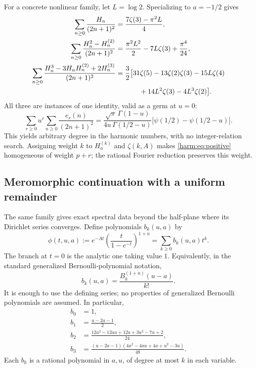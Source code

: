 \documentclass[11pt,letterpaper]{article}
\numberwithin{equation}{section}
\theoremstyle{plain}
\theoremstyle{definition}
\theoremstyle{remark}
\begin{document}
For a concrete nonlinear family, let $L=\log2$.  Specializing to
$a=-1/2$ gives
\begin{align}
 \sum_{n\geq0}\frac{H_n}{(2n+1)^2}
 &=\frac{7\zeta(3)-\pi^2L}{4},\label{harm:eq:odd1}\\
 \sum_{n\geq0}\frac{H_n^2-H_n^{(2)}}{(2n+1)^2}
 &=\frac{\pi^2L^2}{2}-7L\zeta(3)+\frac{\pi^4}{24},
                       \label{harm:eq:odd2}\\
 \sum_{n\geq0}\frac{H_n^3-3H_nH_n^{(2)}+2H_n^{(3)}}{(2n+1)^2}
 &=\frac32\bigl[31\zeta(5)-13\zeta(2)\zeta(3)-15L\zeta(4)
             \notag\\
 &\hspace{1.2cm}+14L^2\zeta(3)-4L^3\zeta(2)\bigr].
                       \label{harm:eq:odd3}
\end{align}
All three are instances of one identity, valid as a germ at $u=0$:
\begin{equation}\label{harm:eq:oddall}
 \sum_{r\geq0}u^r\sum_{n\geq0}\frac{e_r(n)}{(2n+1)^2}
 =\frac{\sqrt\pi\,\Gamma(1-u)}{4u\,\Gamma(1/2-u)}
       \bigl[\psi(1/2)-\psi(1/2-u)\bigr].
\end{equation}
This yields arbitrary degree in the harmonic numbers, with no
integer-relation search.  Assigning weight $k$ to $H_a^{(k)}$ and
$\zeta(k,A)$ makes \eqref{harm:eq:positive} homogeneous of weight
$p+r$; the rational Fourier reduction preserves this weight.

\subsection{Meromorphic continuation with a uniform remainder}

The same family gives exact spectral data beyond the half-plane where
its Dirichlet series converges.  Define polynomials $b_k(u,a)$ by
\begin{equation}\label{harm:eq:bdef}
 \phi(t,u,a):=e^{-At}
       \left(\frac{t}{1-e^{-t}}\right)^{1+u}
       =\sum_{k\geq0}b_k(u,a)t^k.
\end{equation}
The branch at $t=0$ is the analytic one taking value $1$.  Equivalently,
in the standard generalized Bernoulli-polynomial notation,
\[
 b_k(u,a)=\frac{B_k^{(1+u)}(u-a)}{k!}.
\]
It is enough to use the defining series; no properties of generalized
Bernoulli polynomials are assumed.  In particular,
\begin{align}
 b_0&=1,\\
 b_1&=\frac{u-2a-1}{2},\label{harm:eq:b1}\\
 b_2&=\frac{12a^2-12au+12a+3u^2-7u+2}{24},\label{harm:eq:b2}\\
 b_3&=\frac{(u-2a-1)(4a^2-4au+4a+u^2-3u)}{48}.
                       \label{harm:eq:b3}
\end{align}
Each $b_k$ is a rational polynomial in $a,u$, of degree at most $k$
in each variable.
\end{document}
